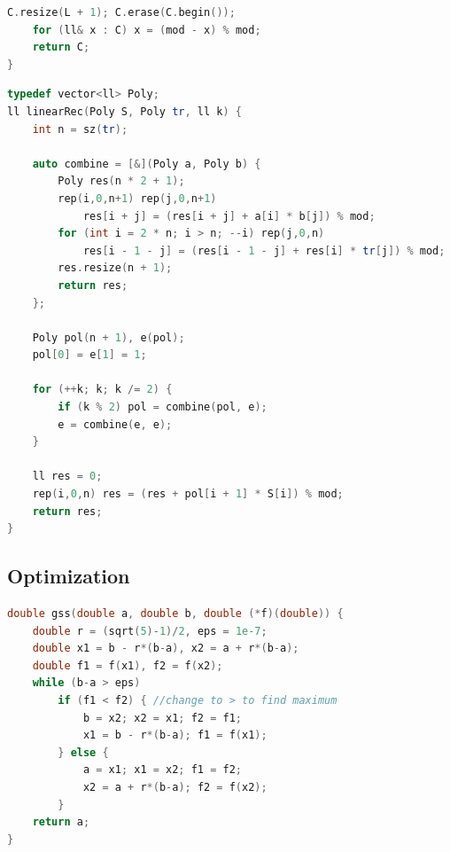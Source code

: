 \begin{multicols}{\Columns}
\begin{lstlisting}[language=C++]
	C.resize(L + 1); C.erase(C.begin());
	for (ll& x : C) x = (mod - x) % mod;
	return C;
}
\end{lstlisting}

\begin{lstlisting}[language=C++]
typedef vector<ll> Poly;
ll linearRec(Poly S, Poly tr, ll k) {
	int n = sz(tr);

	auto combine = [&](Poly a, Poly b) {
		Poly res(n * 2 + 1);
		rep(i,0,n+1) rep(j,0,n+1)
			res[i + j] = (res[i + j] + a[i] * b[j]) % mod;
		for (int i = 2 * n; i > n; --i) rep(j,0,n)
			res[i - 1 - j] = (res[i - 1 - j] + res[i] * tr[j]) % mod;
		res.resize(n + 1);
		return res;
	};

	Poly pol(n + 1), e(pol);
	pol[0] = e[1] = 1;

	for (++k; k; k /= 2) {
		if (k % 2) pol = combine(pol, e);
		e = combine(e, e);
	}

	ll res = 0;
	rep(i,0,n) res = (res + pol[i + 1] * S[i]) % mod;
	return res;
}
\end{lstlisting}


\subsection{Optimization}
\begin{lstlisting}[language=C++]
double gss(double a, double b, double (*f)(double)) {
	double r = (sqrt(5)-1)/2, eps = 1e-7;
	double x1 = b - r*(b-a), x2 = a + r*(b-a);
	double f1 = f(x1), f2 = f(x2);
	while (b-a > eps)
		if (f1 < f2) { //change to > to find maximum
			b = x2; x2 = x1; f2 = f1;
			x1 = b - r*(b-a); f1 = f(x1);
		} else {
			a = x1; x1 = x2; f1 = f2;
			x2 = a + r*(b-a); f2 = f(x2);
		}
	return a;
}
\end{lstlisting}


\end{multicols}
